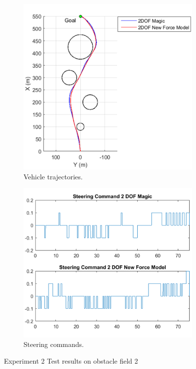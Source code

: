 \documentclass[12pt,onecolumn]{report}
\begin{document}
\begin{figure}
	\centering
	\begin{subfigure}[b]{0.49\columnwidth}
		\centering
		\includegraphics[height=\columnwidth]{Figs/Field2MagicvBekkerTrajectories_cropped.png}
		\caption{{\small Vehicle trajectories.}}   
		\label{fig:ObstacleField2TrajectoriesExp2}
	\end{subfigure}
	\hfill
	\begin{subfigure}[b]{0.49\columnwidth}
		\centering
		\includegraphics[width=\columnwidth]{Figs/Field2MagicvBekkerSteeringCommands_cropped.png}
		\caption{\small Steering commands.}   
		\label{fig:SteeringCommandsField2Exp2}
	\end{subfigure}
	\caption{\small Experiment 2 Test results on obstacle field 2}
	\label{fig:Obst2TestDataExp2}
\end{figure}
\end{document}
